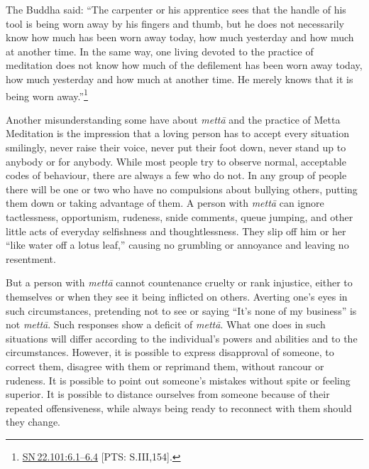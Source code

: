 \documentclass[10pt, openright]{book}
\begin{document}
The Buddha said: “The carpenter or his apprentice sees that the handle of his tool is being worn away by his fingers and thumb, but he does not necessarily know how much has been worn away today, how much yesterday and how much at another time. In the same way, one living devoted to the practice of meditation does not know how much of the defilement has been worn away today, how much yesterday and how much at another time. He merely knows that it is being worn away.”\footnote {\href{https://suttacentral.net/sn22.101/en/sujato\#6.1}{SN 22.101:6.1–6.4} [PTS: S.III,154].}


Another misunderstanding some have about \textit{mettā} and the practice of Metta Meditation is the impression that a loving person has to accept every situation smilingly, never raise their voice, never put their foot down, never stand up to anybody or for anybody. While most people try to observe normal, acceptable codes of behaviour, there are always a few who do not. In any group of people there will be one or two who have no compulsions about bullying others, putting them down or taking advantage of them. A person with \textit{mettā} can ignore tactlessness, opportunism, rudeness, snide comments, queue jumping, and other little acts of everyday selfishness and thoughtlessness. They slip off him or her “like water off a lotus leaf,” causing no grumbling or annoyance and leaving no resentment.


But a person with \textit{mettā} cannot countenance cruelty or rank injustice, either to themselves or when they see it being inflicted on others. Averting one’s eyes in such circumstances, pretending not to see or saying “It’s none of my business” is not \textit{mettā}. Such responses show a deficit of \textit{mettā}. What one does in such situations will differ according to the individual’s powers and abilities and to the circumstances. However, it is possible to express disapproval of someone, to correct them, disagree with them or reprimand them, without rancour or rudeness. It is possible to point out someone’s mistakes without spite or feeling superior. It is possible to distance ourselves from someone because of their repeated offensiveness, while always being ready to reconnect with them should they change.
\end{document}
